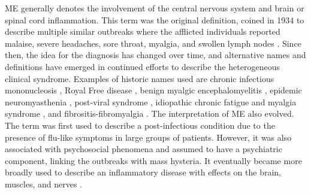 ME generally denotes the involvement of the central nervous system and brain or spinal cord inflammation. This term was the original definition, coined in 1934 to describe multiple similar outbreaks where the afflicted individuals reported malaise, severe headaches, sore throat, myalgia, and swollen lymph nodes \citep{anderson2014QualitativeNatural}. Since then, the idea for the diagnosis has changed over time, and alternative names and definitions have emerged in continued efforts to describe the heterogeneous clinical syndrome. Examples of historic names used are chronic infectious mononucleosis \citep{isaacs1948ChronicInfectious}, Royal Free disease \citep{ramsay1956EncephalomyelitisSimulating, themedicalstaffoftheroyalfreehospital1957OutbreakEncephalomyelitis}, benign myalgic encephalomyelitis \citep{galpine1957BenignMyalgic}, epidemic neuromyasthenia \citep{henderson1959EpidemicNeuromyasthenia}, post-viral syndrome \citep{behan1985PostviralFatigue}, idiopathic chronic fatigue and myalgia syndrome \citep{byrne1988IdiopathicChronic}, and fibrositis-fibromyalgia \citep{pritchard1988FibrositisChronic, yunus1989FibromyalgiaSyndrome}.
The interpretation of ME also evolved. The term was first used to describe a post-infectious condition due to the presence of flu-like symptoms in large groups of patients. However, it was also associated with psychosocial phenomena and assumed to have a psychiatric component, linking the outbreaks with mass hysteria. It eventually became more broadly used to describe an inflammatory disease with effects on the brain, muscles, and nerves \citep{evengard2002ChronicFatigue, instituteofmedicine2015MyalgicEncephalomyelitis}.

